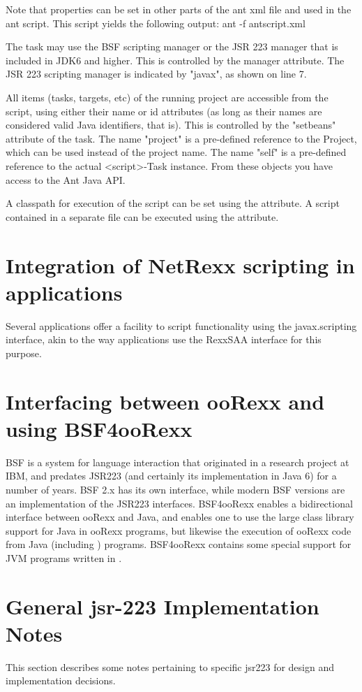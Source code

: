 Note that properties can be set in other parts of the ant xml file and
used in the ant script.
This script yields the following output:
\bash[stdout]
ant -f antscript.xml
\END

The task may use the BSF scripting manager or the JSR 223 manager that
is included in JDK6 and higher. This is controlled by the manager
attribute. The JSR 223 scripting manager is indicated by "javax", as
shown on line 7.

All items (tasks, targets, etc) of the running project are accessible from the script, using either their name or id attributes (as long as their names are considered valid Java identifiers, that is). This is controlled by the "setbeans" attribute of the task. The name "project" is a pre-defined reference to the Project, which can be used instead of the project name. The name "self" is a pre-defined reference to the actual <script>-Task instance.
From these objects you have access to the Ant Java API.

A classpath for execution of the script can be set using the
 attribute. A script contained in a separate file can
be executed using the  attribute.
\section{Integration of NetRexx scripting in applications}
Several applications offer a facility to script functionality using
the javax.scripting interface, akin to the way applications use the
RexxSAA interface for this purpose. 
 
\section{Interfacing between ooRexx and \nr{} using BSF4ooRexx}
BSF is a system for language interaction that originated in a research project at IBM, and predates JSR223 (and certainly its implementation in Java 6) for a number of years. BSF 2.x has its own interface, while modern BSF versions are an implementation of the JSR223 interfaces. BSF4ooRexx enables a bidirectional interface between ooRexx and Java, and enables one to use the large class library support for Java in ooRexx programs, but likewise the execution of ooRexx code from Java (including \nr{}) programs. BSF4ooRexx contains some special support for JVM programs written in \nr{}.

\section{General jsr-223 Implementation Notes}
This section describes some notes pertaining to specific jsr223 for
\nr{} design and implementation decisions.


